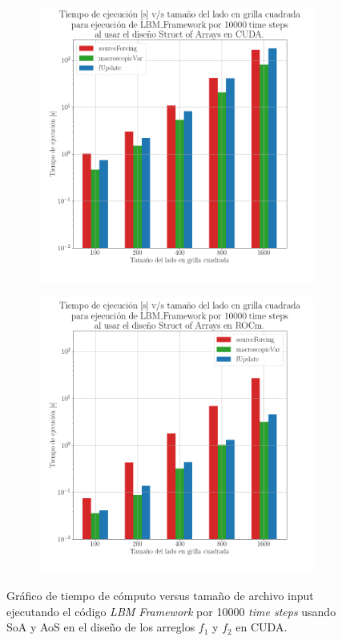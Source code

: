\begin{figure}[H]
  \centering
  \begin{subfigure}{0.5\textwidth}
    \includegraphics[width=\linewidth]{Figures/plot6.png}
    \caption{} 
  \end{subfigure}%
  \begin{subfigure}{0.5\textwidth}
    \includegraphics[width=\linewidth]{Figures/plot8.png}
    \caption{} 
  \end{subfigure}%
  \caption{Gráfico de tiempo de cómputo versus tamaño de archivo input ejecutando el código \textit{LBM Framework} por 10000 \textit{time steps} usando SoA y AoS en el diseño de los arreglos \(f_1\) y \(f_2\) en CUDA.}
  \label{fig:19-1}
\end{figure}

